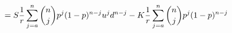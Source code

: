 \documentclass[preview]{standalone}
\begin{document}
\begin{align*}
= S {1 \over r} \sum^{n}_{j=a} {{n}\choose{j}} p^{j} (1-p)^{n-j} u^{j} d^{n-j} - K {1 \over r} \sum^{n}_{j=a} {{n}\choose{j}} p^{j} (1-p)^{n-j}
\end{align*}
\end{document}
